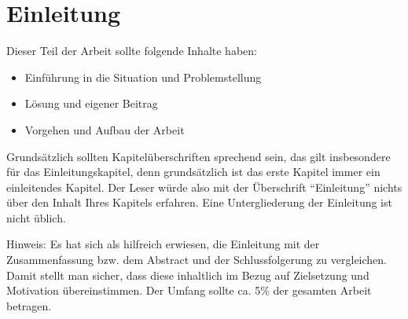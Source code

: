 \section{Einleitung} \label{einleitung}

Dieser Teil der Arbeit sollte folgende Inhalte haben:

\begin{itemize}
\item  Einführung in die Situation und Problemstellung
\item  Lösung und eigener Beitrag
\item  Vorgehen und Aufbau der Arbeit
\end{itemize}

Grundsätzlich sollten Kapitelüberschriften sprechend sein, das gilt insbesondere für das Einleitungskapitel, denn grundsätzlich ist das erste Kapitel immer ein einleitendes Kapitel. Der Leser würde also mit der Überschrift ``Einleitung'' nichts über den Inhalt Ihres Kapitels erfahren. Eine Untergliederung der Einleitung ist nicht üblich.

Hinweis:
Es hat sich als hilfreich erwiesen, die Einleitung mit der Zusammenfassung bzw. dem Abstract und der Schlussfolgerung zu vergleichen. Damit stellt man sicher, dass diese inhaltlich im Bezug auf Zielsetzung und Motivation übereinstimmen. Der Umfang sollte ca. 5\% der gesamten Arbeit betragen.
